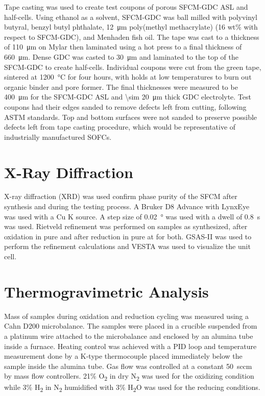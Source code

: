         Tape casting was used to create test coupons of porous SFCM-GDC ASL and half-cells.
        Using ethanol as a solvent, SFCM-GDC was ball milled with polyvinyl butyral, benzyl butyl phthalate, \SI{12}{\micro\meter} poly(methyl methacrylate) (16 wt\% with respect to SFCM-GDC), and Menhaden fish oil.
        The tape was cast to a thickness of \SI{110}{\micro\meter} on Mylar then laminated using a hot press to a final thickness of \SI{660}{\micro\meter}.
        Dense GDC was casted to \SI{30}{\micro\meter} and laminated to the top of the SFCM-GDC to create half-cells.
        Individual coupons were cut from the green tape, sintered at \SI{1200}{\celsius} for four hours, with holds at low temperatures to burn out organic binder and pore former.
        The final thicknesses were measured to be \SI{400}{\micro\meter} for the SFCM-GDC ASL and \SI{\sim 20}{\micro\meter} thick GDC electrolyte.
        Test coupons had their edges sanded to remove defects left from cutting, following ASTM standards.\cite{ASTM2008}
        Top and bottom surfaces were not sanded to preserve possible defects left from tape casting procedure, which would be representative of industrially manufactured SOFCs.

\section{X-Ray Diffraction}
    X-ray diffraction (XRD) was used confirm phase purity of the SFCM after synthesis and during the testing process.
    A Bruker D8 Advance with LynxEye was used with a Cu K\textsubscript{\textalpha{}} source.
    A step size of \SI{0.02}{\degree} was used with a dwell of \SI{0.8}{\second} was used.
    Rietveld refinement was performed on samples as synthesized, after oxidation in pure  and after reduction in pure  at  for both.
    GSAS-II was used to perform the refinement calculations and VESTA was used to visualize the unit cell.\cite{Toby2013,Momma2011}

\section{Thermogravimetric Analysis}
    Mass of samples during oxidation and reduction cycling was measured using a Cahn D200 microbalance.
    The samples were placed in a crucible suspended from a platinum wire attached to the microbalance and enclosed by an alumina tube inside a furnace.
    Heating control was achieved with a PID loop and temperature measurement done by a K-type thermocouple placed immediately below the sample inside the alumina tube.
    Gas flow was controlled at a constant \SI{50}{sccm} by mass flow controllers.
    21\% O\textsubscript{2} in dry N\textsubscript{2} was used for the oxidizing condition while 3\% H\textsubscript{2} in N\textsubscript{2} humidified with 3\% H\textsubscript{2}O was used for the reducing conditions.


